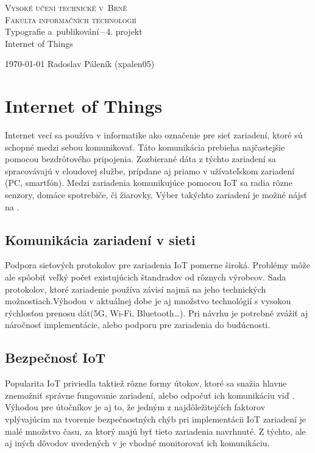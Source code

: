 \documentclass[a4paper, 11pt]{article}
\begin{document}
\begin{titlepage}
\begin{center}
    {\Huge
    \textsc{ Vysoké učení technické v~Brně\\\huge Fakulta informačních technologií}\\
    }
    \LARGE{Typografie a~publikování\,--\,4. projekt\\
    \Huge Internet of Things\\}
\end{center}
{\Large \today \hfill
Radoslav Páleník (xpalen05)}
\end{titlepage}

\section{Internet of Things}
Internet vecí sa používa v informatike ako označenie pre sieť zariadení, ktoré sú schopné medzi sebou komunikovať. Táto komunikácia prebieha najčastejšie pomocou bezdrôtového pripojenia. Zozbierané dáta z týchto zariadení sa spracovávajú v cloudovej službe, prípdane aj priamo v užívateľskom zariadení (PC, smartfón).\cite{Sedlacek2019} Medzi zariadenia komunikujúce pomocou IoT sa radia rôzne senzory, domáce spotrebiče, či žiarovky. Výber takýchto zariadení je možné nájsť na \cite{Harvey2021}.

\subsection{Komunikácia zariadení v sieti}
Podpora sieťových protokolov pre zariadenia IoT pomerne široká. Problémy môže ale spôobiť veľký počet existujúcich štandradov od rôznych výrobcov. Sada protokolov, ktoré zariadenie používa závisí najmä na jeho technických možnostiach.Výhodou v aktuálnej dobe je aj množstvo technológií s vysokou rýchlosťou prenosu dát(5G, Wi-Fi, Bluetooth\dots). Pri návrhu je potrebné zvážiť aj náročnosť implementácie, alebo podporu pre zariadenia do budúcnosti.\cite{IoTPaP} 

\subsection{Bezpečnosť IoT}
Popularita IoT priviedla taktiež rôzne formy útokov, ktoré sa snažia hlavne znemožniť správne fungovanie zariadení, alebo odpočuť ich komunikáciu viď \cite{Urbanovsky2018}. Výhodou pre útočníkov je aj to, že jedným z najdôležitejčích faktorov vplývajúcim na tvorenie bezpečnostných chýb pri implementácii IoT zariadení je malé množstvo času, za ktorý majú byť tieto zariadenia navrhnuté.\cite{HackHandbook} Z týchto, ale aj iných dôvodov uvedených v \cite{Krajc2019} je vhodné monitorovať ich komunikáciu.
\end{document}
